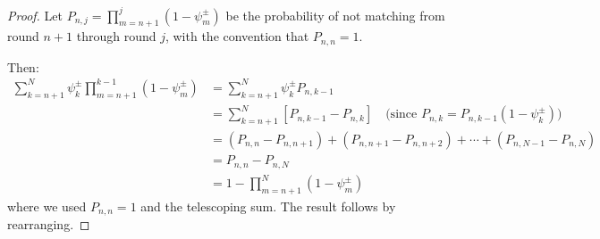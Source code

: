 \begin{proof}
Let $P_{n,j} = \prod_{m=n+1}^{j}(1-\psi_{m}^{\pm})$ be the probability of not matching from round $n+1$ through round $j$, with the convention that $P_{n,n} = 1$.

Then:
\begin{align*}
\sum_{k=n+1}^{N} \psi_{k}^{\pm}\prod_{m=n+1}^{k-1}(1-\psi_{m}^{\pm}) &= \sum_{k=n+1}^{N} \psi_{k}^{\pm} P_{n,k-1}\\
&= \sum_{k=n+1}^{N} [P_{n,k-1} - P_{n,k}] \quad \text{(since } P_{n,k} = P_{n,k-1}(1-\psi_k^{\pm})\text{)}\\
&= (P_{n,n} - P_{n,n+1}) + (P_{n,n+1} - P_{n,n+2}) + \cdots + (P_{n,N-1} - P_{n,N})\\
&= P_{n,n} - P_{n,N}\\
&= 1 - \prod_{m=n+1}^{N}(1-\psi_{m}^{\pm})
\end{align*}
where we used $P_{n,n} = 1$ and the telescoping sum. The result follows by rearranging.
\end{proof}

